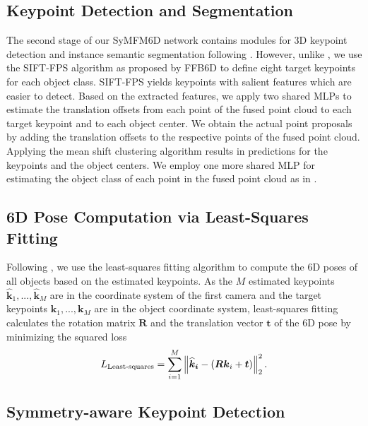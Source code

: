 \subsection{Keypoint Detection and Segmentation}
\label{sec_keypoint_detection_and_segmentation}
The second stage of our SyMFM6D network contains modules for 3D keypoint detection and instance semantic segmentation following \cite{mv6d}. However, unlike \cite{mv6d}, we use the SIFT-FPS algorithm \cite{lowe1999sift} as proposed by FFB6D \cite{ffb6d} to define eight target keypoints for each object class. SIFT-FPS yields keypoints with salient features which are easier to detect.
Based on the extracted features, we apply two shared MLPs to estimate the translation offsets from each point of the fused point cloud to each target keypoint and to each object center.
We obtain the actual point proposals by adding the translation offsets to the respective points of the fused point cloud. 
Applying the mean shift clustering algorithm \cite{cheng1995meanshift} results in predictions for the keypoints and the object centers.
We employ one more shared MLP 
for estimating the object class of each point in the fused point cloud as in \cite{pvn3d}.



\subsection{6D Pose Computation via Least-Squares Fitting}

Following \cite{pvn3d}, we use the least-squares fitting algorithm \cite{leastSquares} to compute the 6D poses of all objects based on the estimated keypoints. As the $M$ estimated keypoints $\boldsymbol{\widehat{k}}_1, ..., \boldsymbol{\widehat{k}}_M$ are in the coordinate system of the first camera and the target keypoints $\boldsymbol k_1, ..., \boldsymbol k_M$ are in the object coordinate system, least-squares fitting calculates the rotation matrix $\boldsymbol R$ and the translation vector $\boldsymbol t$ of the 6D pose by minimizing the squared loss
\begin{equation}
    L_\text{Least-squares} = \sum_{i=1}^M \left\lVert\boldsymbol{\widehat{k}_i} - (\boldsymbol R \boldsymbol k_i + \boldsymbol t)\right\rVert_2^2.
\end{equation}



\subsection{Symmetry-aware Keypoint Detection}

